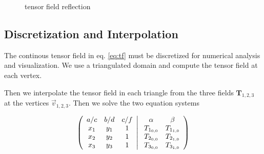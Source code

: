 \documentclass[a4paper,10pt,notitlepage]{scrartcl}
\newcommand{\mat}[1]{\mathbf{#1}}
\begin{document}
\begin{figure}
  \centering
  \caption{tensor field reflection}
  \label{fig:tfd-reflection}
\end{figure}

\subsection{Discretization and Interpolation}

The continous tensor field in eq. \ref{eq:tf} must be discretized for numerical
analysis and visualization. We use a triangulated domain and compute the tensor
field at each vertex.

Then we interpolate the tensor field in each triangle from the three
fields  $\mat{T}_{1,2,3}$ at the vertices $\vec{v}_{1,2,3}$. Then we solve the
two equation systems

\begin{equation}
 \left ( \begin{array}{c c c}
          a/c & b/d & c/f \\
          x_1 & y_1 & 1 \\
          x_2 & y_2 & 1 \\
          x_3 & y_3 & 1
         \end{array}
         \right \rvert
 \left .
      \begin{array}{c c}
      \alpha & \beta \\
       T_{1_{0,0}} & T_{1_{1,0}} \\
       T_{2_{0,0}} & T_{2_{1,0}} \\
       T_{3_{0,0}} & T_{3_{1,0}}
      \end{array}
 \right )
\end{equation}
\end{document}
